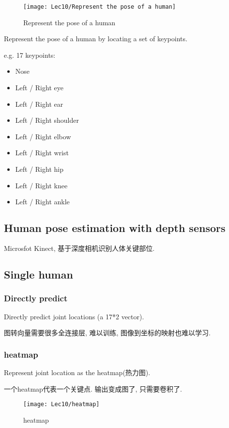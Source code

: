 \begin{wrapfigure}[8]{r}{0.38\textwidth}
    \centering
    \texttt{[image: Lec10/Represent the pose of a human]}
    \caption{Represent the pose of a human}
\end{wrapfigure}


Represent the pose of a human by locating a set of keypoints.

e.g. 17 keypoints:
\begin{itemize}
    \item Nose
    \item Left / Right eye
    \item Left / Right ear
    \item Left / Right shoulder
    \item Left / Right elbow
    \item Left / Right wrist
    \item Left / Right hip
    \item Left / Right knee
    \item Left / Right ankle
\end{itemize}

\subsection{Human pose estimation with depth sensors}
Microsfot Kinect, 基于深度相机识别人体关键部位. 

\subsection{Single human}

\subsubsection{Directly predict}
Directly predict joint locations (a 17*2 vector). 

图转向量需要很多全连接层, 难以训练, 图像到坐标的映射也难以学习. 

\subsubsection{heatmap}
Represent joint location as the heatmap(热力图).

一个heatmap代表一个关键点. 输出变成图了, 只需要卷积了. 

\begin{figure}[H]
    \centering
    \texttt{[image: Lec10/heatmap]}
    \caption{heatmap}
\end{figure}

